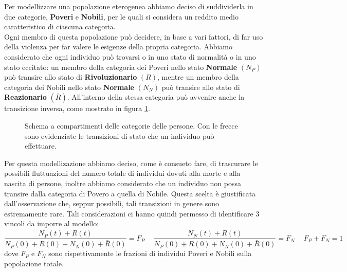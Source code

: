 Per modellizzare una popolazione eterogenea abbiamo deciso di suddividerla in due categorie, \textbf{Poveri} e \textbf{Nobili}, per le quali si considera un reddito medio caratteristico di ciascuna categoria.\\
Ogni membro di questa popolazione può decidere, in base a vari fattori, di far uso della violenza per far valere le esigenze della propria categoria. Abbiamo considerato che ogni individuo può trovarsi o in uno stato di normalità o in uno stato eccitato: un membro della categoria dei Poveri nello stato \textbf{Normale} $(N_P)$ può transire allo stato di \textbf{Rivoluzionario} $(R)$, mentre un membro della categoria dei Nobili nello stato \textbf{Normale} $(N_N)$ può transire allo stato di \textbf{Reazionario} $(\bar{R})$. All'interno della stessa categoria può avvenire anche la transizione inversa, come mostrato in figura \ref{fig:CompartmentScheme}.\\
\begin{figure}[H]
	\centering
	\label{fig:CompartmentScheme}
	\caption{Schema a compartimenti delle categorie delle persone. Con le frecce sono evidenziate le transizioni di stato che un individuo può effettuare.}
\end{figure}
Per questa modellizazione abbiamo deciso, come è consueto fare, di trascurare le possibili fluttuazioni del numero totale di individui dovuti alla morte e alla nascita di persone, inoltre abbiamo considerato che un individuo non possa transire dalla categoria di Povero a quella di Nobile. Questa scelta è giustificata dall'osservazione che, seppur possibili, tali transizioni in genere sono estremamente rare. Tali considerazioni ci hanno quindi permesso di identificare 3 vincoli da imporre al modello:
\begin{equation}
    \frac{N_P(t)+R(t)}{N_P(0)+R(0)+N_N(0)+\bar{R}(0)}=F_P \quad\:\frac{N_N(t)+\bar{R}(t)}{N_P(0)+R(0)+N_N(0)+\bar{R}(0)}=F_N \quad\: F_P+F_N=1 
	\label{vincoli}
\end{equation}
dove $F_P$ e $F_N$ sono rispettivamente le frazioni di individui Poveri e Nobili sulla popolazione totale.\\

